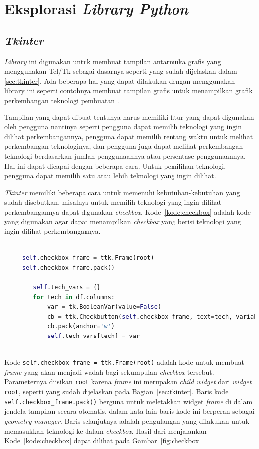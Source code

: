 \section{Eksplorasi \textit{Library Python}}
\label{sec:library}

\subsection{\textit{Tkinter}}
\label{subsec:tkinter}

\textit{Library} ini digunakan untuk membuat tampilan antarmuka grafis yang menggunakan Tcl/Tk sebagai dasarnya seperti yang sudah dijelaskan dalam \ref{sec:tkinter}. Ada beberapa hal yang dapat dilakukan dengan menggunakan library ini seperti contohnya membuat tampilan grafis untuk menampilkan grafik perkembangan teknologi pembuatan \web.

Tampilan yang dapat dibuat tentunya harus memiliki fitur yang dapat digunakan oleh pengguna nantinya seperti pengguna dapat memilih teknologi yang ingin dilihat perkembangannya, pengguna dapat memilih rentang waktu untuk melihat perkembangan teknologinya, dan pengguna juga dapat melihat perkembangan teknologi berdasarkan jumlah penggunaannya atau persentase penggunaannya. Hal ini dapat dicapai dengan beberapa cara. Untuk pemilihan teknologi, pengguna dapat memilih satu atau lebih teknologi yang ingin dilihat. 

\textit{Tkinter} memiliki beberapa cara untuk memenuhi kebutuhan-kebutuhan yang sudah disebutkan, misalnya untuk memilih teknologi yang ingin dilihat perkembangannya dapat digunakan \textit{checkbox}. Kode~\ref{kode:checkbox} adalah kode yang digunakan agar dapat menampilkan \textit{checkbox} yang berisi teknologi yang ingin dilihat perkembangannya.

\begin{lstlisting}[language=Python, caption=Kode untuk menampilkan \textit{checkbox} berisi teknologi, label=kode:checkbox]

     self.checkbox_frame = ttk.Frame(root)
     self.checkbox_frame.pack()

        self.tech_vars = {}
        for tech in df.columns:
            var = tk.BooleanVar(value=False)
            cb = ttk.Checkbutton(self.checkbox_frame, text=tech, variable=var)
            cb.pack(anchor='w')
            self.tech_vars[tech] = var
    
\end{lstlisting}

Kode \verb|self.checkbox_frame = ttk.Frame(root)| adalah kode untuk membuat \textit{frame} yang akan menjadi wadah bagi sekumpulan \textit{checkbox} tersebut. Parameternya diisikan \verb|root| karena \textit{frame} ini merupakan \textit{child widget} dari \textit{widget} \verb|root|, seperti yang sudah dijelaskan pada Bagian~\ref{sec:tkinter}. Baris kode \verb|self.checkbox_frame.pack()| berguna untuk meletakkan widget \textit{frame} di dalam jendela tampilan secara otomatis, dalam kata lain baris kode ini berperan sebagai \textit{geometry manager}. Baris selanjutnya adalah pengulangan yang dilakukan untuk memasukkan teknologi ke dalam \textit{checkbox}. Hasil dari menjalankan Kode~\ref{kode:checkbox} dapat dilihat pada Gambar~\ref{fig:checkbox}

